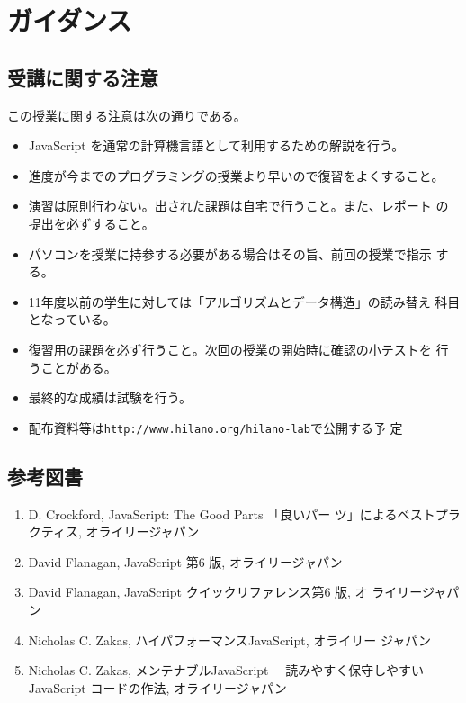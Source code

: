 
\Textfalse
\renewcommand{\postchaptername}{回}

\frontmatter
\maketitle
\tableofcontents
\mainmatter
\chapter{ガイダンス}
\section{受講に関する注意}
この授業に関する注意は次の通りである。
\begin{itemize}
 \item JavaScript を通常の計算機言語として利用するための解説を行う。
 \item 進度が今までのプログラミングの授業より早いので復習をよくすること。
 \item 演習は原則行わない。出された課題は自宅で行うこと。また、レポート
       の提出を必ずすること。
 \item パソコンを授業に持参する必要がある場合はその旨、前回の授業で指示
       する。
 \item 11年度以前の学生に対しては「アルゴリズムとデータ構造」の読み替え
       科目となっている。
  \item 復習用の課題を必ず行うこと。次回の授業の開始時に確認の小テストを
       行うことがある。
\item 最終的な成績は試験を行う。
 \item 配布資料等は\texttt{http://www.hilano.org/hilano-lab}で公開する予
       定
\end{itemize}
\section{参考図書}
\begin{enumerate}
 \item D. Crockford, JavaScript: The Good Parts 「良いパー
	 ツ」によるベストプラ クティス, オライリージャパン
 \item David Flanagan, JavaScript 第6 版, オライリージャパン\label{JS6}
 \item David Flanagan, JavaScript クイックリファレンス第6 版, オ
	 ライリージャパン
 \item Nicholas C. Zakas, ハイパフォーマンスJavaScript, オライリー
	 ジャパン
 \item Nicholas C. Zakas, メンテナブルJavaScript 　読みやすく保守しやすいJavaScript 
コードの作法, オライリージャパン
\end{enumerate}
